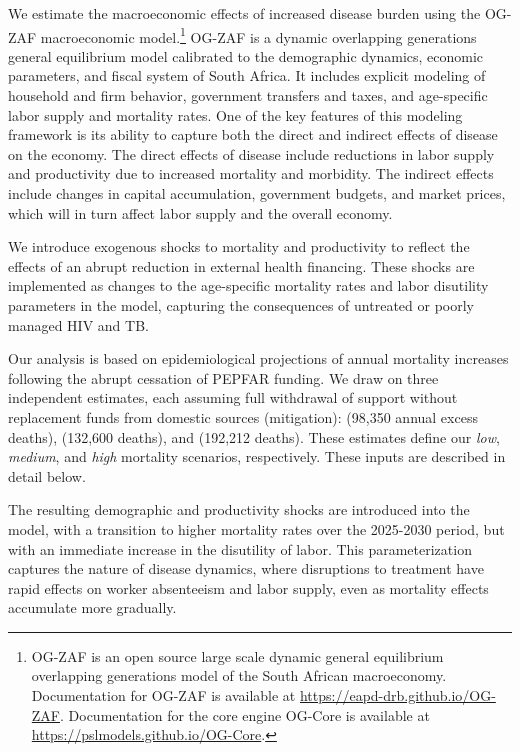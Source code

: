 \documentclass[letterpaper,12pt]{article}
\theoremstyle{definition}
\begin{document}
\begin{spacing}{1.5}
We estimate the macroeconomic effects of increased disease burden using the OG-ZAF macroeconomic model.\footnote{OG-ZAF is an open source large scale dynamic general equilibrium overlapping generations model of the South African macroeconomy. Documentation for OG-ZAF is available at \href{https://eapd-drb.github.io/OG-ZAF}{https://eapd-drb.github.io/OG-ZAF}. Documentation for the core engine OG-Core is available at \href{https://pslmodels.github.io/OG-Core}{https://pslmodels.github.io/OG-Core}.} OG-ZAF is a dynamic overlapping generations general equilibrium model calibrated to the demographic dynamics, economic parameters, and fiscal system of South Africa. It includes explicit modeling of household and firm behavior, government transfers and taxes, and age-specific labor supply and mortality rates. One of the key features of this modeling framework is its ability to capture both the direct and indirect effects of disease on the economy. The direct effects of disease include reductions in labor supply and productivity due to increased mortality and morbidity. The indirect effects include changes in capital accumulation, government budgets, and market prices, which will in turn affect labor supply and the overall economy.

We introduce exogenous shocks to mortality and productivity to reflect the effects of an abrupt reduction in external health financing. These shocks are implemented as changes to the age-specific mortality rates and labor disutility parameters in the model, capturing the consequences of untreated or poorly managed HIV and TB.

Our analysis is based on epidemiological projections of annual mortality increases following the abrupt cessation of PEPFAR funding. We draw on three independent estimates, each assuming full withdrawal of support without replacement funds from domestic sources (mitigation): \citet{Brink2025} (98,350 annual excess deaths), \citet{Gandhi2025} (132,600 deaths), and \citet{KS2025} (192,212 deaths). These estimates define our \textit{low}, \textit{medium}, and \textit{high} mortality scenarios, respectively. These inputs are described in detail below.

The resulting demographic and productivity shocks are introduced into the model, with a transition to higher mortality rates over the 2025-2030 period, but with an immediate increase in the disutility of labor. This parameterization captures the nature of disease dynamics, where disruptions to treatment have rapid effects on worker absenteeism and labor supply, even as mortality effects accumulate more gradually.



\end{spacing}
\end{document}
